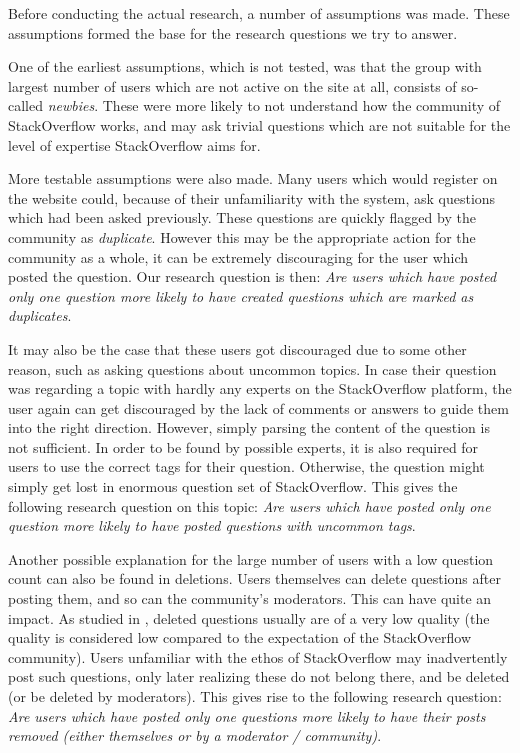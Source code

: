 \documentclass[conference]{IEEEtran}
\begin{document}
Before conducting the actual research, a number of assumptions was made. These
assumptions formed the base for the research questions we try to answer.

One of the earliest assumptions, which is not tested, was that the group with
largest number of users which are not active on the site at all, consists of
so-called \textit{newbies}. These were more likely to not understand how the
community of StackOverflow works, and may ask trivial questions which are not
suitable for the level of expertise StackOverflow aims for.

More testable assumptions were also made. Many users which would register on
the website could, because of their unfamiliarity with the system, ask
questions which had been asked previously. These questions are quickly flagged
by the community as \textit{duplicate}. However this may be the appropriate
action for the community as a whole, it can be extremely discouraging for the
user which posted the question. Our research question is then: \textit{Are
users which have posted only one question more likely to have created questions
which are marked as duplicates}.

It may also be the case that these users got discouraged due to some other
reason, such as asking questions about uncommon topics. In case their question
was regarding a topic with hardly any experts on the StackOverflow platform,
the user again can get discouraged by the lack of comments or answers to guide
them into the right direction. However, simply parsing the content of the
question is not sufficient. In order to be found by possible experts, it is
also required for users to use the correct tags for their question. Otherwise,
the question might simply get lost in enormous question set of StackOverflow.
This gives the following research question on this topic: \textit{Are users
which have posted only one question more likely to have posted questions with
uncommon tags}.

Another possible explanation for the large number of users with a low question
count can also be found in deletions. Users themselves can delete questions
after posting them, and so can the community's moderators. This can have quite
an impact. As studied in \cite{correa2014chaff}, deleted questions usually are
of a very low quality (the quality is considered low compared to the
expectation of the StackOverflow community). Users unfamiliar with the ethos of
StackOverflow may inadvertently post such questions, only later realizing these
do not belong there, and be deleted (or be deleted by moderators). This gives
rise to the following research question: \textit{Are users which have posted
only one questions more likely to have their posts removed (either themselves
or by a moderator / community)}.
\end{document}

